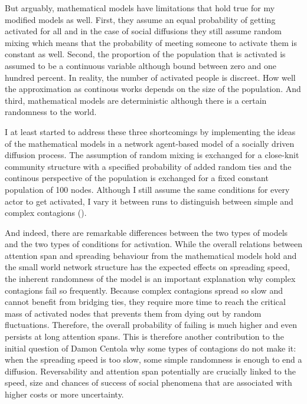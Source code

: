 \documentclass[a4paper,12pt]{article}
\begin{document}
But arguably, mathematical models have limitations that hold true for my modified models as well. First, they assume an equal probability of getting activated for all and in the case of social diffusions they still assume random mixing which means that the probability of meeting someone to activate them is constant as well. Second, the proportion of the population that is activated is assumed to be a continuous variable although bound between zero and one hundred percent. In reality, the number of activated people is discreet. How well the approximation as continous works depends on the size of the population. And third, mathematical models are deterministic although there is a certain randomness to the world.

I at least started to address these three shortcomings by implementing the ideas of the mathematical models in a network agent-based model of a socially driven diffusion process. The assumption of random mixing is exchanged for a close-knit community structure with a specified probability of added random ties and the continous perspective of the population is exchanged for a fixed constant population of 100 nodes. Although I still assume the same conditions for every actor to get activated, I vary it between runs to distinguish between simple and complex contagions (\cite{centolaHowBehaviorSpreads2018}). 

And indeed, there are remarkable differences between the two types of models and the two types of conditions for activation. While the overall relations between attention span and spreading behaviour from the mathematical models hold and the small world network structure has the expected effects on spreading speed, the inherent randomness of the model is an important explanation why complex contagions fail so frequently. Because complex contagions spread so slow and cannot benefit from bridging ties, they require more time to reach the critical mass of activated nodes that prevents them from dying out by random fluctuations. Therefore, the overall probability of failing is much higher and even persists at long attention spans. This is therefore another contribution to the initial question of Damon Centola why some types of contagions do not make it: when the spreading speed is too slow, some simple randomness is enough to end a diffusion. Reversability and attention span potentially are crucially linked to the speed, size and chances of success of social phenomena that are associated with higher costs or more uncertainty.
\end{document}

